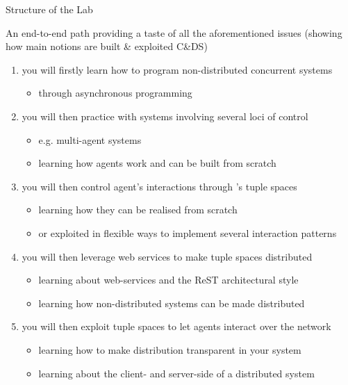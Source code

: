 \documentclass[presentation]{beamer}\mode<presentation>{\usetheme{AMSCesenaPurpleAndGold}}
\begin{document}
\begin{frame}[c,allowframebreaks]{Structure of the Lab}

	An end-to-end path providing a taste of all the aforementioned issues (showing how main notions are built \& exploited C\&DS)
	\medskip
	\begin{enumerate}
		\item you will firstly learn how to program non-distributed concurrent systems
		\begin{itemize}
			\item through \alert{asynchronous programming}
		\end{itemize}

		\medskip

		\item you will then practice with systems involving several loci of control
		\begin{itemize}
			\item e.g. \alert{multi-agent systems}
			\item learning how \jade{} agents work and can be built from scratch
		\end{itemize}

		\medskip

		\item you will then control agent's interactions through \alert{\linda{}'s tuple spaces}
		\begin{itemize}
			\item learning how they can be realised from scratch
			\item or exploited in flexible ways to implement several \alert{interaction patterns}
		\end{itemize}

		\framebreak

		\item you will then leverage \alert{web services} to make tuple spaces distributed
		\begin{itemize}
			\item learning about web-services and the ReST architectural style
			\item learning how non-distributed systems can be made distributed
		\end{itemize}

		\medskip

		\item you will then exploit tuple spaces to let agents interact \alert{over the network}
		\begin{itemize}
			\item learning how to make distribution transparent in your system
			\item learning about the client- and server-side of a distributed system
		\end{itemize}


\end{enumerate}
\end{frame}
\end{document}
